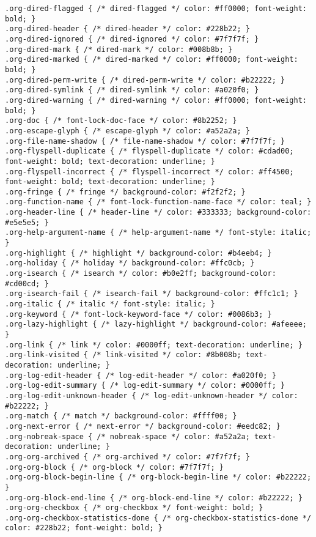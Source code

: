 \documentclass[11pt]{article}
\begin{document}
\begin{verbatim}
.org-dired-flagged { /* dired-flagged */ color: #ff0000; font-weight: bold; }
.org-dired-header { /* dired-header */ color: #228b22; }
.org-dired-ignored { /* dired-ignored */ color: #7f7f7f; }
.org-dired-mark { /* dired-mark */ color: #008b8b; }
.org-dired-marked { /* dired-marked */ color: #ff0000; font-weight: bold; }
.org-dired-perm-write { /* dired-perm-write */ color: #b22222; }
.org-dired-symlink { /* dired-symlink */ color: #a020f0; }
.org-dired-warning { /* dired-warning */ color: #ff0000; font-weight: bold; }
.org-doc { /* font-lock-doc-face */ color: #8b2252; }
.org-escape-glyph { /* escape-glyph */ color: #a52a2a; }
.org-file-name-shadow { /* file-name-shadow */ color: #7f7f7f; }
.org-flyspell-duplicate { /* flyspell-duplicate */ color: #cdad00; font-weight: bold; text-decoration: underline; }
.org-flyspell-incorrect { /* flyspell-incorrect */ color: #ff4500; font-weight: bold; text-decoration: underline; }
.org-fringe { /* fringe */ background-color: #f2f2f2; }
.org-function-name { /* font-lock-function-name-face */ color: teal; }
.org-header-line { /* header-line */ color: #333333; background-color: #e5e5e5; }
.org-help-argument-name { /* help-argument-name */ font-style: italic; }
.org-highlight { /* highlight */ background-color: #b4eeb4; }
.org-holiday { /* holiday */ background-color: #ffc0cb; }
.org-isearch { /* isearch */ color: #b0e2ff; background-color: #cd00cd; }
.org-isearch-fail { /* isearch-fail */ background-color: #ffc1c1; }
.org-italic { /* italic */ font-style: italic; }
.org-keyword { /* font-lock-keyword-face */ color: #0086b3; }
.org-lazy-highlight { /* lazy-highlight */ background-color: #afeeee; }
.org-link { /* link */ color: #0000ff; text-decoration: underline; }
.org-link-visited { /* link-visited */ color: #8b008b; text-decoration: underline; }
.org-log-edit-header { /* log-edit-header */ color: #a020f0; }
.org-log-edit-summary { /* log-edit-summary */ color: #0000ff; }
.org-log-edit-unknown-header { /* log-edit-unknown-header */ color: #b22222; }
.org-match { /* match */ background-color: #ffff00; }
.org-next-error { /* next-error */ background-color: #eedc82; }
.org-nobreak-space { /* nobreak-space */ color: #a52a2a; text-decoration: underline; }
.org-org-archived { /* org-archived */ color: #7f7f7f; }
.org-org-block { /* org-block */ color: #7f7f7f; }
.org-org-block-begin-line { /* org-block-begin-line */ color: #b22222; }
.org-org-block-end-line { /* org-block-end-line */ color: #b22222; }
.org-org-checkbox { /* org-checkbox */ font-weight: bold; }
.org-org-checkbox-statistics-done { /* org-checkbox-statistics-done */ color: #228b22; font-weight: bold; }

\end{verbatim}
\end{document}
